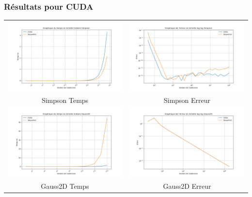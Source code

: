 \documentclass[10pt]{beamer}
\begin{document}
\begin{frame}
    \frametitle{Résultats pour CUDA}
        \small
    \begin{tabular}{cc}
        \includegraphics[width=0.45\linewidth]{../Images/time_simpson_cuda.png} &
        \includegraphics[width=0.45\linewidth]{../Images/error_simpson_cuda.png} \\
        Simpson Temps & Simpson Erreur\\
        \includegraphics[width=0.45\linewidth]{../Images/time_Gauss2D_cuda.png} &
        \includegraphics[width=0.45\linewidth]{../Images/error_Gauss2D_cuda.png} \\
        Gauss2D Temps & Gauss2D Erreur\\
    \end{tabular}
        
\end{frame}
\end{document}
